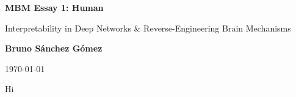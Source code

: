 \documentclass[11pt,a4paper]{article}
\begin{document}
\author{Bruno Sánchez Gómez}
\date{\today}

\begin{titlepage}
    \centering
    \vspace*{2cm}
    {\Huge \bfseries MBM Essay 1: Human \par}
    \vspace{2cm}
    {\Large {\Huge Interpretability in Deep Networks \& Reverse-Engineering Brain Mechanisms} \par}
    \vspace{8cm}
    {\large \textbf{Bruno Sánchez Gómez} \par}
    \vfill
    {\large \today \par}
\end{titlepage}

Hi

%

\clearpage
\printbibliography%
\end{document}
